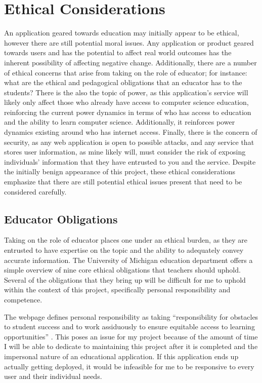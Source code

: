 \documentclass[10pt,twocolumn]{article}
\begin{document}
\section{Ethical Considerations}

An application geared towards education may initially appear to be ethical, however there are still potential moral issues. 
Any application or product geared towards 
users and has the potential to affect real world outcomes has the inherent possibility of affecting negative change. 
Additionally, there are a number of ethical concerns that arise from taking on the role of educator; for instance: what 
are the ethical and pedagogical obligations that an educator has to the students? There is the also the topic of power, as this 
application’s service will likely only affect those who already have 
access to computer science education, reinforcing the current power dynamics in terms of who has access to education and 
the ability to learn computer science. Additionally, it reinforces power dynamics existing around who has internet 
access. Finally, there is the concern of security, as any web application is open to possible attacks, and any service 
that stores user information, as mine likely will, must consider the risk of exposing individuals’ information that they 
have entrusted to you and the service. Despite the initially benign appearance of this project, these ethical 
considerations emphasize that there are still potential ethical issues present that need to be considered carefully. 

\subsection{Educator Obligations}

Taking on the role of educator places one under an ethical burden, as they are entrusted to have expertise on 
the topic and the ability to adequately convey accurate information. The University of Michigan education department 
offers a simple overview of nine core ethical obligations that teachers should uphold. Several of the obligations that 
they bring up will be difficult for me to uphold within the context of this project, specifically
personal responsibility and competence. 

The webpage defines personal responsibility as taking “responsibility for obstacles to student success and to work 
assiduously to ensure equitable access to learning opportunities” \cite{MichiganEducation}. This poses an issue for 
my project because of the amount of time I will be able to dedicate to maintaining this project after it is completed 
and the impersonal nature of an educational application. If this application ends up actually getting deployed, it would 
be infeasible for me to be responsive to every user and their individual needs. 
\end{document}
